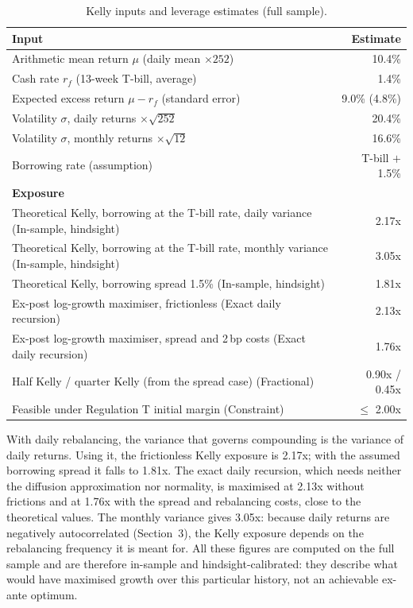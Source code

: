 \documentclass[11pt,a4paper]{article}
\begin{document}
\begin{table}[H]
\small
\caption{Kelly inputs and leverage estimates (full sample).}
\label{tab:kelly}
\begin{tabularx}{\linewidth}{L r}
\toprule
\textbf{Input} & \textbf{Estimate} \\
\midrule
Arithmetic mean return $\mu$ (daily mean $\times 252$) & 10.4\% \\
Cash rate $r_f$ (13-week T-bill, average) & 1.4\% \\
Expected excess return $\mu - r_f$ (standard error) & 9.0\% (4.8\%) \\
Volatility $\sigma$, daily returns $\times\sqrt{252}$ & 20.4\% \\
Volatility $\sigma$, monthly returns $\times\sqrt{12}$ & 16.6\% \\
Borrowing rate (assumption) & T-bill $+$ 1.5\% \\
\midrule
\textbf{Exposure} & \\
Theoretical Kelly, borrowing at the T-bill rate, daily variance (In-sample, hindsight) & 2.17x \\
Theoretical Kelly, borrowing at the T-bill rate, monthly variance (In-sample, hindsight) & 3.05x \\
Theoretical Kelly, borrowing spread 1.5\% (In-sample, hindsight) & 1.81x \\
Ex-post log-growth maximiser, frictionless (Exact daily recursion) & 2.13x \\
Ex-post log-growth maximiser, spread and 2\,bp costs (Exact daily recursion) & 1.76x \\
Half Kelly / quarter Kelly (from the spread case) (Fractional) & 0.90x / 0.45x \\
Feasible under Regulation T initial margin (Constraint) & $\le$ 2.00x \\
\bottomrule
\end{tabularx}
\end{table}
With daily rebalancing, the variance that governs compounding is the variance of daily returns. Using it, the frictionless Kelly exposure is 2.17x; with the assumed borrowing spread it falls to 1.81x. The exact daily recursion, which needs neither the diffusion approximation nor normality, is maximised at 2.13x without frictions and at 1.76x with the spread and rebalancing costs, close to the theoretical values. The monthly variance gives 3.05x: because daily returns are negatively autocorrelated (Section~3), the Kelly exposure depends on the rebalancing frequency it is meant for. All these figures are computed on the full sample and are therefore in-sample and hindsight-calibrated: they describe what would have maximised growth over this particular history, not an achievable ex-ante optimum.
\end{document}
